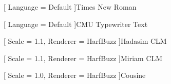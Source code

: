 \usepackage[
    bidi = basic,
    greek,
    english
]{babel}


[
    Language    = Default
]{Times New Roman}

[
    Language    = Default
]{CMU Typewriter Text}


[
    Scale       = 1.1,
    Renderer    = HarfBuzz
]{Hadasim CLM}

[
    Scale       = 1.1,
    Renderer    = HarfBuzz
]{Miriam CLM}

[
    Scale       = 1.0,
    Renderer    = HarfBuzz
]{Cousine}




\usepackage{yfonts}


\usepackage{relsize}

